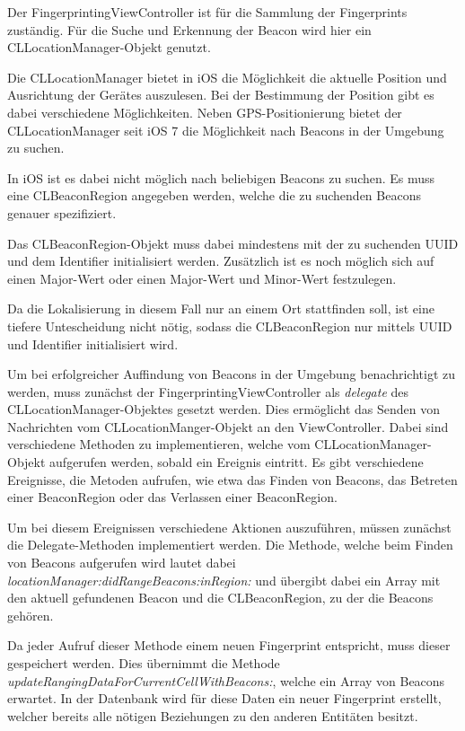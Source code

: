 Der FingerprintingViewController ist für die Sammlung der Fingerprints zuständig. 
Für die Suche und Erkennung der Beacon wird hier ein CLLocationManager-Objekt genutzt.

Die CLLocationManager bietet in iOS die Möglichkeit die aktuelle Position und Ausrichtung der Gerätes auszulesen. 
Bei der Bestimmung der Position gibt es dabei verschiedene Möglichkeiten. Neben GPS-Positionierung bietet der CLLocationManager seit iOS 7 die Möglichkeit nach Beacons in der Umgebung zu suchen.

In iOS ist es dabei nicht möglich nach beliebigen Beacons zu suchen. Es muss eine CLBeaconRegion angegeben werden, welche die zu suchenden Beacons genauer spezifiziert. 

Das CLBeaconRegion-Objekt muss dabei mindestens mit der zu suchenden UUID und dem Identifier initialisiert werden. Zusätzlich ist es noch möglich sich auf einen Major-Wert oder einen Major-Wert und Minor-Wert festzulegen. 

Da die Lokalisierung in diesem Fall nur an einem Ort stattfinden soll, ist eine tiefere Untescheidung nicht nötig, sodass die CLBeaconRegion nur mittels UUID und Identifier initialisiert wird. 

Um bei erfolgreicher Auffindung von Beacons in der Umgebung benachrichtigt zu werden, muss zunächst der FingerprintingViewController als \emph{delegate} des CLLocationManager-Objektes gesetzt werden. 
Dies ermöglicht das Senden von Nachrichten vom CLLocationManger-Objekt an den ViewController. Dabei sind verschiedene Methoden zu implementieren, welche vom CLLocationManager-Objekt aufgerufen werden, sobald ein Ereignis eintritt. Es gibt verschiedene Ereignisse, die Metoden aufrufen, wie etwa das Finden von Beacons, das Betreten einer BeaconRegion oder das Verlassen einer BeaconRegion. 

Um bei diesem Ereignissen verschiedene Aktionen auszuführen, müssen zunächst die Delegate-Methoden implementiert werden. Die Methode, welche beim Finden von Beacons aufgerufen wird lautet dabei \emph{locationManager:didRangeBeacons:inRegion:} und übergibt dabei ein Array mit den aktuell gefundenen Beacon und die CLBeaconRegion, zu der die Beacons gehören.

Da jeder Aufruf dieser Methode einem neuen Fingerprint entspricht, muss dieser gespeichert werden. 
Dies übernimmt die Methode \emph{updateRangingDataForCurrentCellWithBeacons:}, welche ein Array von Beacons erwartet. In der Datenbank wird für diese Daten ein neuer Fingerprint erstellt, welcher bereits alle nötigen Beziehungen zu den anderen Entitäten besitzt. 

